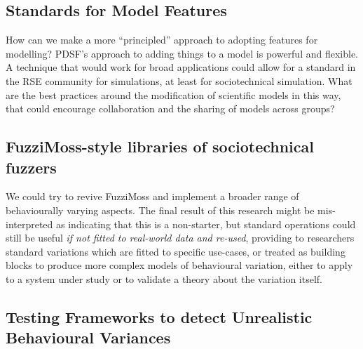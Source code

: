 \subsection{Standards for Model Features}\label{subsec:standard_aosm_techniques}


How can we make a more ``principled'' approach to adopting features for
modelling? PDSF's approach to adding things to a model is powerful and flexible.
A technique that would work for broad applications could allow for a standard in
the RSE community for simulations, at least for sociotechnical simulation. What
are the best practices around the modification of scientific models in this way,
that could encourage collaboration and the sharing of models across groups?




\subsection{FuzziMoss-style libraries of sociotechnical
fuzzers}\label{future_work_revive_fuzzimoss}




We could try to revive FuzziMoss and implement a broader range of behaviourally
varying aspects. The final result of this research might be mis-interpreted as
indicating that this is a non-starter, but standard operations could still be
useful \emph{if not fitted to real-world data and re-used}, providing to
researchers standard variations which are fitted to specific use-cases, or
treated as building blocks to produce more complex models of behavioural
variation, either to apply to a system under study or to validate a theory about
the variation itself.


\subsection{Testing Frameworks to detect Unrealistic Behavioural Variances}\label{sciunits_for_unrealistic_states}

